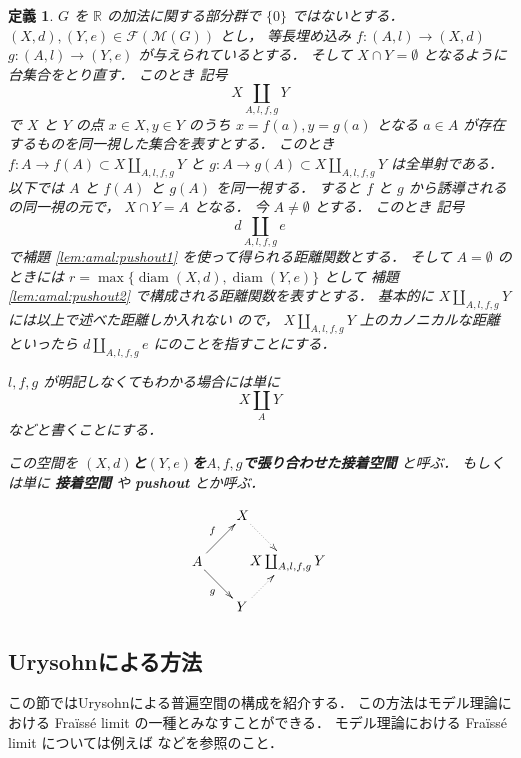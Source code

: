 \documentclass[leqno, 12pt]{jsarticle}
\newtheorem{df}[thm]{定義}
\newcommand{\rr}{\mathbb{R}}
\DeclareMathOperator{\di}{diam}
\begin{document}
\begin{df}\label{df:amal:pushoutspace}
$G$
を
$\rr$
の加法に関する部分群で
$\{0\}$
ではないとする．
$(X, d), (Y, e)\in \mathscr{F}(\mathscr{M}(G))$
とし，
等長埋め込み
$f\colon (A, l)\to (X, d)$
$g\colon  (A, l)\to (Y, e)$
が与えられているとする．
そして
$X\cap Y=\emptyset$
となるように台集合をとり直す．
このとき
記号
\[
X\coprod_{A, l, f, g}Y
\]
で
$X$
と
$Y$
の点
$x\in X, y\in Y$
のうち
$x=f(a), y=g(a)$
となる
$a\in A$
が存在するものを同一視した集合を表すとする．
このとき
$f\colon  A\to f(A)\subset X\coprod_{A, l, f, g}Y
$
と
$g\colon  A\to g(A)\subset X\coprod_{A, l, f, g}Y
$
は全単射である．
以下では
$A$
と
$f(A)$
と
$g(A)$
を同一視する．
すると
$f$
と
$g$
から誘導されるの同一視の元で，
$X\cap Y=A$
となる．
今
$A\neq \emptyset$
とする．
このとき
記号
\[
d\coprod_{A, l, f, g}e
\]
で補題 
\ref{lem:amal:pushout1}
を使って得られる距離関数とする．
そして
$A=\emptyset$
のときには
$r=\max\{\di(X, d), \di(Y, e)\}$
として
補題
 \ref{lem:amal:pushout2}
 で構成される距離関数を表すとする．
基本的に
$X\coprod_{A, l, f, g}Y$
には以上で述べた距離しか入れない
ので，
$X\coprod_{A, l, f, g}Y$
上のカノニカルな距離といったら
$d\coprod_{A, l, f, g}e$
にのことを指すことにする．

$l, f, g$
が明記しなくてもわかる場合には単に
\[
X\coprod_{A}Y
\]
などと書くことにする．

この空間を
\textbf{$(X, d)$と$(Y, e)$を$A, f, g$で張り合わせた接着空間}
と呼ぶ．
もしくは単に
\textbf{接着空間}
や
\textbf{pushout}
とか呼ぶ．

  \[
   \xymatrix@ur{
A \ar[r]^f \ar[d]_g & X \ar@{.>}[d] \\
Y \ar@{.>}[r] & X\coprod_{A, l, f, g}Y
 & }
\]


\end{df}

\subsection{Urysohnによる方法}
この節ではUrysohnによる普遍空間の構成を紹介する．
この方法はモデル理論における
Fra\"{i}ss\'{e} limit
の一種とみなすことができる．
モデル理論における
Fra\"{i}ss\'{e} limit
については例えば
\cite{Hodges}などを参照のこと．
\end{document}

